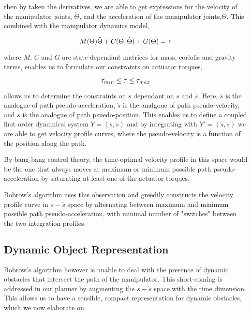 \documentclass[letterpaper,12pt]{article} %
\begin{document}
then by taken the derivatives, we are able to get expressions for the velocity of the manipulator joints, $\dot{\Theta}$, and the acceleration of the manipulator joints,$\ddot{\Theta}$. This combined with the manipulator dynamics model,

\begin{equation}
M( \Theta ) \ddot{\Theta} + C( \Theta, \dot{\Theta} ) + G(\Theta) = \tau \\
\end{equation}

where $M$, $C$ and $G$ are state-dependant matrices for mass, coriolis and gravity terms, enables us to formulate our constraints on actuator torques,

\begin{equation}
\tau_{min} \leq \tau \leq \tau_{max} \\
\end{equation}

allows us to determine the constraints on $\ddot{s}$ dependant on $s$ and $\dot{s}$. Here, $\ddot{s}$ is the analogue of path pseudo-acceleration, $\dot{s}$ is the analgoue of path pseudo-velocity, and $s$ is the analogue of path psuedo-position. This enables us to define a coupled first order dynamical system $Y = (s, \dot{s})$ and by integrating with $Y' = (\dot{s}, \ddot{s})$ we are able to get velocity profile curves, where the pseudo-velocity is a function of the position along the path.

By bang-bang control theory, the time-optimal velocity profile in this space would be the one that always moves at maximum or minimum possible path pseudo-acceleration by saturating at least one of the actuator torques.

Bobrow's algorithm uses this observation and greedily constructs the velocity profile curve in $s-\dot{s}$ space by alternating between maximum and minimum possible path pseudo-acceleration, with minimal number of "switches" between the two integration profiles.

\subsection{Dynamic Object Representation}\label{subsec:dynobj}

Bobrow's algorithm however is unable to deal with the presence of dynamic obstacles that intersect the path of the manipulator. This short-coming is addressed in our planner by augmenting the $s-\dot{s}$ space with the time dimension. This allows us to have a sensible, compact representation for dynamic obstacles, which we now elaborate on.
\end{document}

